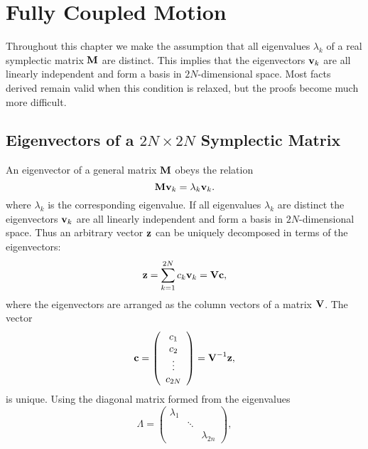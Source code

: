  
 
\chapter{Fully Coupled Motion}
\label{full}
 
Throughout this chapter we make the assumption that all eigenvalues 
$\lambda_k$ of a real symplectic matrix $\bold{M}$ are distinct. 
This implies that the eigenvectors $\bold{v}_k$ are all linearly
independent and form a basis in $2N$-dimensional space. 
Most facts derived remain valid when this condition is relaxed, 
but the proofs become much more difficult.
 
 
\section{Eigenvectors of a $2N \times 2N$ Symplectic Matrix}
\label{complex}
An eigenvector of a general matrix $\bold{M}$ obeys the relation
\begin{equation}
\bold{M} \bold{v}_k = \lambda_k \bold{v}_k.
\end{equation}
where $\lambda_k$ is the corresponding eigenvalue.
If all eigenvalues $\lambda_k$ are distinct
the eigenvectors $\bold{v}_k$ are all linearly independent
and form a basis in $2N$-dimensional space.
Thus an arbitrary vector $\bold{z}$ can be uniquely decomposed in
terms of the eigenvectors:
\begin{equation}
\bold{z} = \sum_{k=1}^{2N} c_k \bold{v}_k = \bold{V} \bold{c},
\end{equation}
where the eigenvectors are arranged as the column vectors of a matrix
$\bold{V}$.
The vector
\begin{equation}
\bold{c} = \left(\begin{array}{c}
c_1 \\ c_2 \\ \vdots \\ c_{2N} \end{array} \right) =
\bold{V}^{-1} \bold{z},
\end{equation}
is unique.
Using the diagonal matrix formed from the eigenvalues
\begin{equation}
\Lambda = \left( \begin{array}{ccc}
\lambda_1 & & \\ & \ddots & \\ & & \lambda_{2n}
\end{array} \right),
\end{equation}
